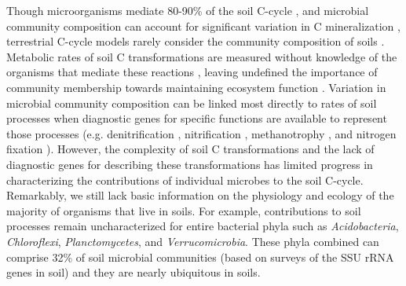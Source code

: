 Though microorganisms mediate 80-90\% of the soil C-cycle
\citep{ColemanCrossley_1996,Nannipieri_2003}, and microbial community
composition can account for significant variation in C mineralization
\citep{Strickland_2009} , terrestrial C-cycle models rarely consider the
community composition of soils \citep{Zak2006,Reed2007}. Metabolic rates of
soil C transformations are measured without knowledge of the organisms that
mediate these reactions \citep{Nannipieri_2003}, leaving undefined the
importance of community membership towards maintaining ecosystem function
\citep{Nannipieri_2003,Schimel_2012,Allison_2008}. Variation in microbial
community composition can be linked most directly to rates of soil processes
when diagnostic genes for specific functions are available to represent those
processes (e.g. denitrification \citep{Cavigelli2000}, nitrification
\citep{Carney2004,Hawkes2005,Webster2005}, methanotrophy \citep{Gulledge1997},
and nitrogen fixation \citep{Hsu2009}). However, the complexity of soil
C transformations and the lack of diagnostic genes for describing
these transformations has limited progress in characterizing the contributions
of individual microbes to the soil C-cycle. Remarkably, we still lack basic
information on the physiology and ecology of the majority of organisms that
live in soils. For example, contributions to soil processes remain
uncharacterized for entire bacterial phyla such as \textit{Acidobacteria},
\textit{Chloroflexi}, \textit{Planctomycetes}, and \textit{Verrucomicrobia}.
These phyla combined can comprise 32\% of soil microbial communities (based on
surveys of the SSU rRNA genes in soil) \citep{Janssen2006,Buckley2002} and they
are nearly ubiquitous in soils. 

